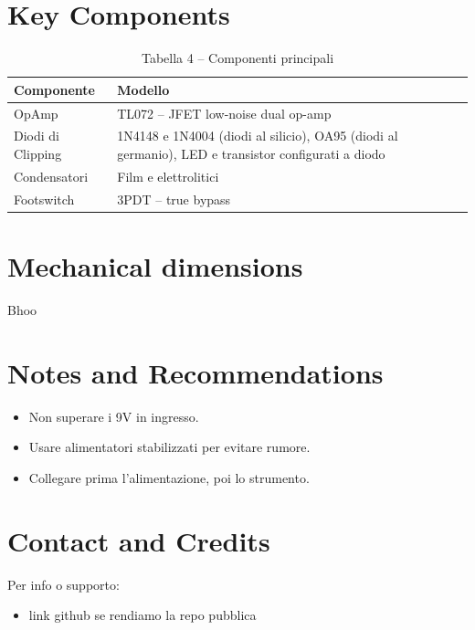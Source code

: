 \documentclass[a4paper,11pt]{article}
\begin{document}
\section{Key Components}

\begin{table}[h!]
    \centering
    \renewcommand{\arraystretch}{1.2}
    \begin{tabular}{|l|p{10cm}|}
        \hline
        \textbf{Componente} & \textbf{Modello} \\
        \hline
        OpAmp & TL072 – JFET low-noise dual op-amp \\
        \hline
        Diodi di Clipping & 1N4148 e 1N4004 (diodi al silicio), OA95 (diodi al germanio), LED e transistor configurati a diodo \\
        \hline
        Condensatori & Film e elettrolitici \\
        \hline
        Footswitch & 3PDT – true bypass \\
        \hline
        \end{tabular}
    \caption*{Tabella 4 – Componenti principali}
\end{table}    

\section{Mechanical dimensions}
Bhoo

\section{Notes and Recommendations}

\begin{itemize}
    \item Non superare i 9V in ingresso.
    \item Usare alimentatori stabilizzati per evitare rumore.
    \item Collegare prima l'alimentazione, poi lo strumento.
\end{itemize}

\section{Contact and Credits}

Per info o supporto:
\begin{itemize}
    \item link github se rendiamo la repo pubblica
\end{itemize}
\end{document}

